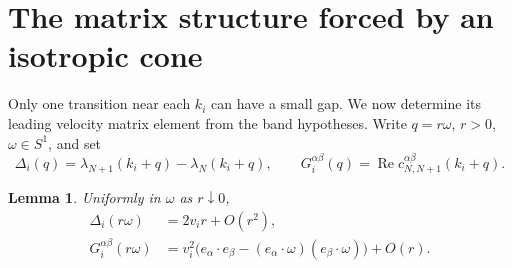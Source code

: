 \documentclass[11pt,a4paper]{article}
\numberwithin{equation}{section}
\DeclareMathOperator{\Rea}{Re}
\newtheorem{lemma}[theorem]{Lemma}
\theoremstyle{remark}
\begin{document}
\section{The matrix structure forced by an isotropic cone}

Only one transition near each $k_i$ can have a small gap. We now
determine its leading velocity matrix element from the band hypotheses.
Write $q=r\omega$, $r>0$, $\omega\in S^1$, and set
\begin{equation}\label{eq:local-definitions}
 \Delta_i(q)=\lambda_{N+1}(k_i+q)-\lambda_N(k_i+q),\qquad
 G_i^{\alpha\beta}(q)=\Rea c_{N,N+1}^{\alpha\beta}(k_i+q).
\end{equation}

\begin{lemma}\label{lem:cone}
Uniformly in $\omega$ as $r\downarrow0$,
\begin{align}
 \Delta_i(r\omega)&=2v_i r+O(r^2),\label{eq:local-gap}\\
 G_i^{\alpha\beta}(r\omega)
   &=v_i^2\bigl(e_\alpha\cdot e_\beta
            -(e_\alpha\cdot\omega)(e_\beta\cdot\omega)\bigr)+O(r).
       \label{eq:local-matrix}
\end{align}
\end{lemma}
\end{document}
